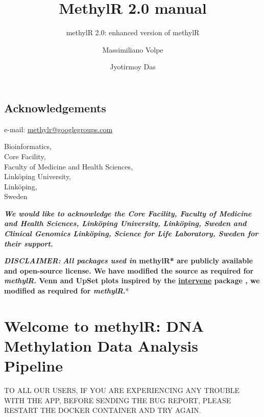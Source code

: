 \documentclass[
  a4paper,
  DIV=11,
  numbers=noendperiod,
  oneside,
  open=any]{scrreport}
\title{MethylR 2.0 manual}
\subtitle{methylR 2.0: enhanced version of methylR}
\author{Massimiliano Volpe \and Jyotirmoy Das}
\date{}
\renewcommand*\contentsname{Table of contents}
\newcommand\contentsname{Table of contents}
\begin{document}
\maketitle

\renewcommand*\contentsname{Contents}
{
\hypersetup{linkcolor=blue}
\setcounter{tocdepth}{1}
\tableofcontents
}
\listoffigures
{}

\chapter*{Acknowledgements}\label{acknowledgements}


e-mail: \url{methylr@googlegroups.com}

Bioinformatics,\\
Core Facility,\\
Faculty of Medicine and Health Sciences,\\
Linköping University,\\
Linköping,\\
Sweden

\textbf{\emph{We would like to acknowledge the Core Facility, Faculty of
Medicine and Health Sciences, Linköping University, Linköping, Sweden
and Clinical Genomics Linköping, Science for Life Laboratory, Sweden for
their support.}}

\textbf{\emph{DISCLAIMER: }} \textbf{\emph{All packages used in
}methylR* are publicly available and open-source license. We have
modified the source as required for \emph{methylR}. Venn and UpSet plots
inspired by the \href{https://github.com/asntech/intervene}{intervene}
package \autocite{khan2017intervene}, we modified as required for
\emph{methylR}.}*

\part{Welcome to methylR: DNA Methylation Data Analysis Pipeline}

\begin{tcolorbox}[enhanced jigsaw, breakable, colback=white, colbacktitle=quarto-callout-important-color!10!white, opacityback=0, left=2mm, bottomrule=.15mm, opacitybacktitle=0.6, coltitle=black, bottomtitle=1mm, toprule=.15mm, toptitle=1mm, arc=.35mm, titlerule=0mm, rightrule=.15mm, title=\textcolor{quarto-callout-important-color}{\faExclamation}\hspace{0.5em}{Important}, colframe=quarto-callout-important-color-frame, leftrule=.75mm]

TO ALL OUR USERS, IF YOU ARE EXPERIENCING ANY TROUBLE WITH THE APP,
BEFORE SENDING THE BUG REPORT, PLEASE RESTART THE DOCKER CONTAINER AND
TRY AGAIN.

\end{tcolorbox}
\end{document}
